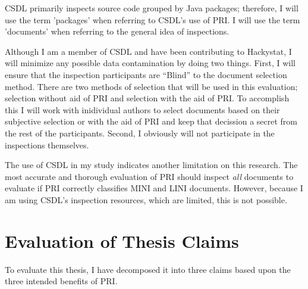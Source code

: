 
CSDL primarily inspects source code grouped by Java packages; therefore, I
will use the term 'packages' when referring to CSDL's use of PRI. I will
use the term 'documents' when referring to the general idea of inspections.

Although I am a member of CSDL and have been contributing to Hackystat, I
will minimize any possible data contamination by doing two things. First, I
will ensure that the inspection participants are ``Blind'' to the document
selection method. There are two methods of selection that will be used in
this evaluation; selection without aid of PRI and selection with the aid of
PRI. To accomplish this I will work with inidividual authors to select
documents based on their subjective selection or with the aid of PRI and
keep that decission a secret from the rest of the participants. Second, I
obviously will not participate in the inspections themselves.


The use of CSDL in my study indicates another limitation on this research.
The most accurate and thorough evaluation of PRI should inspect
\textit{all} documents to evaluate if PRI correctly classifies MINI and
LINI documents. However, because I am using CSDL's inspection resources,
which are limited, this is not possible.



\section{Evaluation of Thesis Claims}
To evaluate this thesis, I have decomposed it into three claims based upon
the three intended benefits of PRI.

